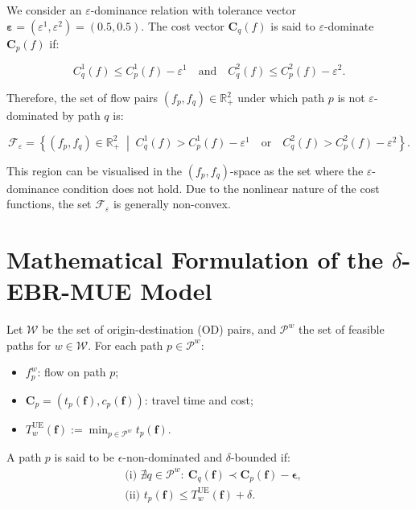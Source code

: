 \documentclass[11pt]{article}
\begin{document}
We consider an $\varepsilon$-dominance relation with tolerance vector 
\(\boldsymbol{\varepsilon} = (\varepsilon^1, \varepsilon^2) = (0.5, 0.5)\).
The cost vector \( \mathbf{C}_q(f) \) is said to $\varepsilon$-dominate \( \mathbf{C}_p(f) \) if:

\[
C_q^1(f) \leq C_p^1(f) - \varepsilon^1
\quad \text{and} \quad
C_q^2(f) \leq C_p^2(f) - \varepsilon^2.
\]

Therefore, the set of flow pairs \( (f_p, f_q) \in \mathbb{R}_+^2 \) under which path \( p \) is not $\varepsilon$-dominated by path \( q \) is:

\[
\mathcal{F}_{\varepsilon} = \left\{
(f_p, f_q) \in \mathbb{R}_+^2 \;\middle|\;
C_q^1(f) > C_p^1(f) - \varepsilon^1
\quad \text{or} \quad
C_q^2(f) > C_p^2(f) - \varepsilon^2
\right\}.
\]

This region can be visualised in the \( (f_p, f_q) \)-space as the set where the $\varepsilon$-dominance condition does not hold. Due to the nonlinear nature of the cost functions, the set \( \mathcal{F}_\varepsilon \) is generally non-convex.




\section{Mathematical Formulation of the \texorpdfstring{$\delta$}{delta}-EBR-MUE Model}

Let $\mathcal{W}$ be the set of origin-destination (OD) pairs, and $\mathcal{P}^w$ the set of feasible paths for $w \in \mathcal{W}$. For each path $p \in \mathcal{P}^w$:
\begin{itemize}
    \item $f_p^w$: flow on path $p$;
    \item $\mathbf{C}_p = (t_p(\mathbf{f}), c_p(\mathbf{f}))$: travel time and cost;
    \item $T_w^{\mathrm{UE}}(\mathbf{f}) := \min_{p \in \mathcal{P}^w} t_p(\mathbf{f})$.
\end{itemize}

A path $p$ is said to be $\epsilon$-non-dominated and $\delta$-bounded if:
\begin{align*}
    & \text{(i) } \nexists q \in \mathcal{P}^w: \ \mathbf{C}_q(\mathbf{f}) \prec \mathbf{C}_p(\mathbf{f}) - \boldsymbol{\epsilon}, \\
    & \text{(ii) } t_p(\mathbf{f}) \leq T_w^{\mathrm{UE}}(\mathbf{f}) + \delta.
\end{align*}
\end{document}
